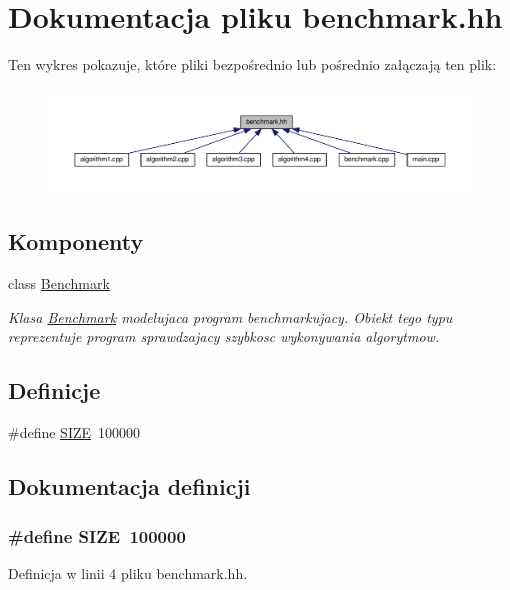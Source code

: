 \hypertarget{benchmark_8hh}{\section{Dokumentacja pliku benchmark.\-hh}
\label{benchmark_8hh}
}
Ten wykres pokazuje, które pliki bezpośrednio lub pośrednio załączają ten plik\-:\nopagebreak
\begin{figure}[H]
\begin{center}
\leavevmode
\includegraphics[width=350pt]{benchmark_8hh__dep__incl}
\end{center}
\end{figure}
\subsection*{Komponenty}
\begin{DoxyCompactItemize}
\item 
class \hyperlink{class_benchmark}{Benchmark}
\begin{DoxyCompactList}\small\item\em Klasa \hyperlink{class_benchmark}{Benchmark} modelujaca program benchmarkujacy. Obiekt tego typu reprezentuje program sprawdzajacy szybkosc wykonywania algorytmow. \end{DoxyCompactList}\end{DoxyCompactItemize}
\subsection*{Definicje}
\begin{DoxyCompactItemize}
\item 
\#define \hyperlink{benchmark_8hh_a70ed59adcb4159ac551058053e649640}{S\-I\-Z\-E}~100000
\end{DoxyCompactItemize}


\subsection{Dokumentacja definicji}
\hypertarget{benchmark_8hh_a70ed59adcb4159ac551058053e649640}{
\subsubsection[{S\-I\-Z\-E}]{\setlength{\rightskip}{0pt plus 5cm}\#define S\-I\-Z\-E~100000}}\label{benchmark_8hh_a70ed59adcb4159ac551058053e649640}


Definicja w linii 4 pliku benchmark.\-hh.

